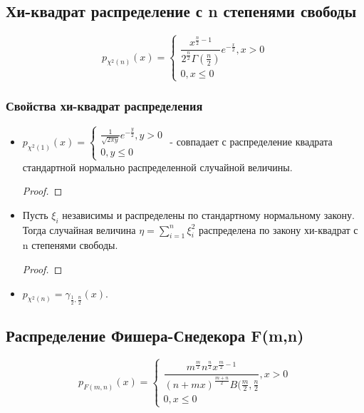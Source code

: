\subsection{Хи-квадрат распределение с n степенями свободы}

\begin{definition}
  \[
    p_{\chi^2(n)} (x) = \begin{cases}
       \dfrac{x^{\frac{n}{2} - 1}}{2^\frac{n}{2} \Gamma(\frac{n}{2})} e^{-\frac{x}{2}}, x>0 \\
       0, x\leqslant 0
    \end{cases}
  \]
\end{definition}

\subsubsection{Свойства хи-квадрат распределения}

\begin{itemize}
  \item $p_{\chi^2(1)} (x) = \begin{cases}
      \frac{1}{\sqrt{2\pi y}} e^{-\frac{y}{2}}, y>0 \\
      0, y\leqslant 0
    \end{cases}$ - совпадает с распределение квадрата стандартной нормально распределенной случайной величины.
    
    \begin{proof}
    
    \end{proof}

  \item Пусть $\xi_i$ независимы и распределены по стандартному нормальному закону. Тогда случайная величина $\eta = \sum_{i=1}^n \xi_i^2$ распределена по закону хи-квадрат с n степенями свободы.
  
    \begin{proof}
    \end{proof}

  \item $p_{\chi^2(n)} = \gamma_{\frac{1}{2}, \frac{n}{2}} (x)$.
\end{itemize}

\subsection{Распределение Фишера-Снедекора F(m,n)}

\begin{definition}
  \[
    p_{F(m, n)} (x) = \begin{cases}
      \dfrac{m^\frac{m}{2} n^\frac{n}{2} x^{\frac{m}{2}-1}}{(n+mx)^\frac{m+n}{2} B(\frac{m}{2}, \frac{n}{2}}, x>0 \\
      0, x\leqslant 0
    \end{cases}
  \]
\end{definition}

